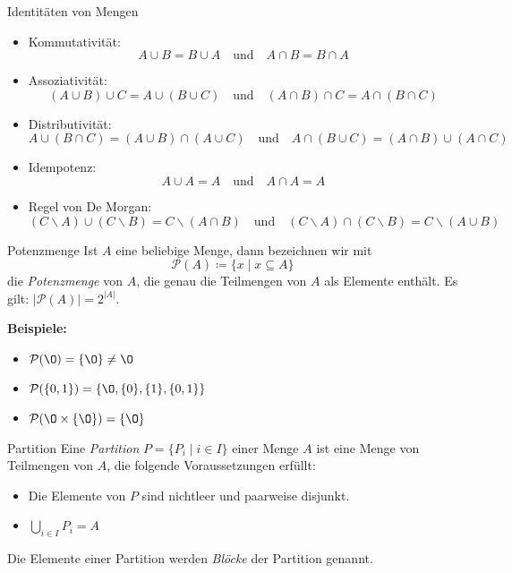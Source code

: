 \begin{definition}{Identitäten von Mengen}
    \begin{itemize}
        \setlength{\itemsep}{0pt}
        \setlength{\parskip}{0pt}
        \setlength{\parsep}{0pt}
        \item Kommutativität: \[A \cup B = B \cup A \quad \text{und} \quad A \cap B = B \cap A\]
        \item Assoziativität: \[(A \cup B) \cup C = A \cup (B \cup C) \quad \text{und} \quad (A \cap B) \cap C = A \cap (B \cap C)\]
        \item Distributivität: \[A \cup (B \cap C) = (A \cup B) \cap (A \cup C) \quad \text{und} \quad A \cap (B \cup C) = (A \cap B) \cup (A \cap C)\]
        \item Idempotenz: \[A \cup A = A \quad \text{und} \quad A \cap A = A\]
        \item Regel von De Morgan: \[(C \backslash A) \cup (C \backslash B) = C \backslash (A \cap B) \quad \text{und} \quad (C \backslash A) \cap (C \backslash B) = C \backslash (A \cup B)\]
    \end{itemize}
\end{definition}

\begin{definition}{Potenzmenge}
    Ist $A$ eine beliebige Menge, dann bezeichnen wir mit \[\mathcal{P}(A) \coloneqq \{x \mid x \subseteq A\}\] die \emph{Potenzmenge} von $A$, die genau die Teilmengen von $A$ als Elemente enthält.
    Es gilt: $|\mathcal{P}(A)| = 2^{|A|}$.
\end{definition}

\textbf{Beispiele:}
\begin{itemize}
    \item $\mathcal{P}(\O) = \{\O\} \neq \O$
    \item $\mathcal{P}(\{0,1\}) = \{\O, \{0\}, \{1\}, \{0,1\}\}$
    \item $\mathcal{P}(\O \times \{ \O \}) = \{ \O \}$
\end{itemize}

\begin{definition}{Partition}
    Eine \emph{Partition} $P = \{P_i \mid i \in I\}$ einer Menge $A$ ist eine Menge von Teilmengen von $A$, die folgende Voraussetzungen erfüllt:
    \begin{itemize}
        \item Die Elemente von $P$ sind nichtleer und paarweise disjunkt.
        \item $\bigcup_{i \in I} P_i = A$
    \end{itemize}
    Die Elemente einer Partition werden \emph{Blöcke} der Partition genannt.
\end{definition}

